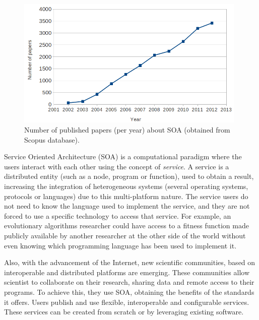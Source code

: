 \begin{figure}
\centering
\includegraphics[width=26pc]{gfx/soa/papersYear.png}
\caption{Number of published papers (per year) about SOA (obtained from Scopus database).}
\label{fig:soapapers}
\end{figure}


Service Oriented Architecture (SOA) is a computational
paradigm where the users %
interact with each other using the concept of
{\em service}. A service is a distributed entity (such as a node, program or
function), used to obtain a result, increasing the integration of heterogeneous
systems (several operating systems, protocols or languages) due to
this multi-platform nature. The service users do not need to know
the language used to implement the service, and they are not
forced to use a specific technology to access that service. For
example, an evolutionary algorithms researcher could have access to a
fitness function made publicly available by another researcher at the
other side of the world without even knowing which programming language
has been used to implement it. %

Also, with the advancement of the Internet, new scientific
communities, based on interoperable and distributed platforms are
emerging. These communities allow scientist to collaborate on their
research, sharing data and remote access to their programs. To achieve
this, they use SOA, obtaining the benefits of the standards it
offers. Users publish and use flexible, interoperable and configurable
services. These services can be created from scratch or by leveraging
existing software. %

